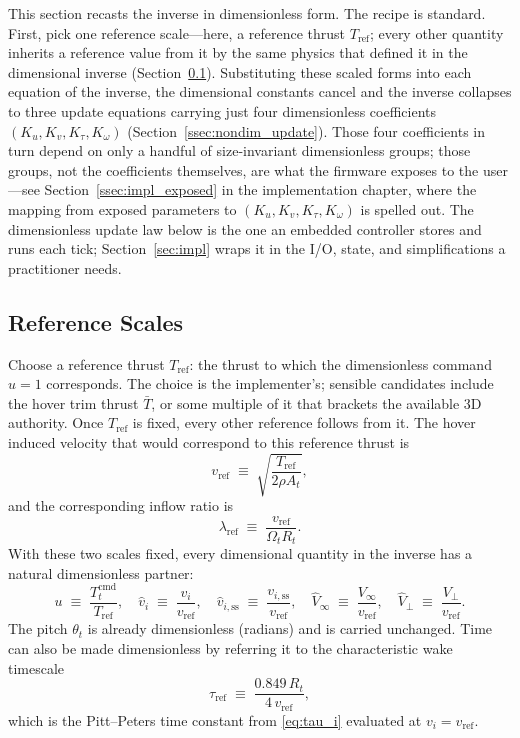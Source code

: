 \documentclass[11pt,a4paper]{article}
\newcommand{\OmegaT}{\Omega_t}
\newcommand{\Rt}{R_t}
\newcommand{\At}{A_t}
\newcommand{\thetat}{\theta_t}
\newcommand{\vi}{v_i}
\newcommand{\viss}{v_{i,\text{ss}}}
\newcommand{\bT}{\bar{T}}
\newcommand{\Tcmd}{T_t^{\text{cmd}}}
\begin{document}
This section recasts the inverse in dimensionless form. The recipe is
standard. First, pick one reference scale---here, a reference thrust
\(T_{\text{ref}}\); every other quantity inherits a reference value
from it by the same physics that defined it in the dimensional inverse
(Section~\ref{ssec:nondim_refs}). Substituting these scaled forms into
each equation of the inverse, the dimensional constants cancel and the
inverse collapses to three update equations carrying just four
dimensionless coefficients \((K_u,K_v,K_\tau,K_\omega)\)
(Section~\ref{ssec:nondim_update}). Those four coefficients in turn
depend on only a handful of size-invariant dimensionless groups; those
groups, not the coefficients themselves, are what the firmware exposes
to the user---see Section~\ref{ssec:impl_exposed} in the implementation
chapter, where the mapping from exposed parameters to \((K_u,K_v,K_\tau,K_\omega)\) is
spelled out. The dimensionless update law below is the one an embedded
controller stores and runs each tick; Section~\ref{sec:impl} wraps it
in the I/O, state, and simplifications a practitioner needs.

\subsection{Reference Scales}\label{ssec:nondim_refs}

Choose a reference thrust \(T_{\text{ref}}\): the thrust to which the
dimensionless command \(u=1\) corresponds. The choice is the implementer's;
sensible candidates include the hover trim thrust \(\bT\), or some multiple
of it that brackets the available 3D authority. Once \(T_{\text{ref}}\) is
fixed, every other reference follows from it. The hover induced velocity
that would correspond to this reference thrust is
\begin{equation}
v_{\text{ref}} \;\equiv\; \sqrt{\frac{T_{\text{ref}}}{2\rho\At}},
\label{eq:nondim_vref}
\end{equation}
and the corresponding inflow ratio is
\begin{equation}
\lambda_{\text{ref}} \;\equiv\; \frac{v_{\text{ref}}}{\OmegaT\Rt}.
\label{eq:nondim_lref}
\end{equation}
With these two scales fixed, every dimensional quantity in the inverse
has a natural dimensionless partner:
\begin{equation}
u \;\equiv\; \frac{\Tcmd}{T_{\text{ref}}},\quad
\hat{v}_i \;\equiv\; \frac{\vi}{v_{\text{ref}}},\quad
\hat{v}_{i,\text{ss}} \;\equiv\; \frac{\viss}{v_{\text{ref}}},\quad
\hat{V}_\infty \;\equiv\; \frac{V_\infty}{v_{\text{ref}}},\quad
\hat{V}_\perp \;\equiv\; \frac{V_\perp}{v_{\text{ref}}}.
\label{eq:nondim_vars}
\end{equation}
The pitch \(\thetat\) is already dimensionless (radians) and is carried
unchanged. Time can also be made dimensionless by referring it to the
characteristic wake timescale
\begin{equation}
\tau_{\text{ref}} \;\equiv\; \frac{0.849\,\Rt}{4\,v_{\text{ref}}},
\label{eq:nondim_tauref}
\end{equation}
which is the Pitt--Peters time constant from \eqref{eq:tau_i} evaluated at
\(\vi=v_{\text{ref}}\).
\end{document}
